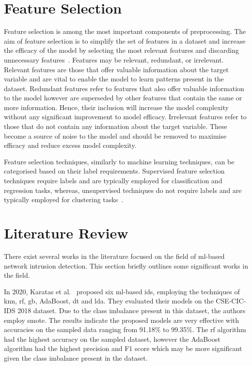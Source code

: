 \section{Feature Selection}%
\label{sec:feat_eng}
Feature selection is among the most important components of preprocessing.
The aim of feature selection is to simplify the set of features in a dataset and
increase the efficacy of the model by selecting the most relevant features and
discarding unnecessary features~\cite{feat-sel}. Features may be relevant,
redundant, or irrelevant. Relevant features are those that offer valuable
information about the target variable and are vital to enable the model to
learn patterns present in the dataset. Redundant features refer to features
that also offer valuable information to the model however are superseded by
other features that contain the same or more information. Hence, their
inclusion will increase the model complexity without any significant
improvement to model efficacy. Irrelevant features refer to those that do not
contain any information about the target variable. These become a source of
noise to the model and should be removed to maximise efficacy and reduce excess
model complexity.

Feature selection techniques, similarly to machine learning techniques, can be
categorised based on their label requirements. Supervised feature selection
techniques require labels and are typically employed for classification and
regression tasks, whereas, unsupervised techniques do not require labels and
are typically employed for clustering tasks~\cite{feat-sel}.

\section{Literature Review}%
\label{sec:literature}

There exist several works in the literature focused on the field of
\gls{ml}-based network intrusion detection. This section briefly outlines some
significant works in the field.

In 2020, Karatas et al.~\cite{Karatas} proposed six \gls{ml}-based \gls{ids},
employing the techniques of \gls{knn}, \gls{rf}, \gls{gb}, AdaBoost, \gls{dt}
and \gls{lda}. They evaluated their models on the CSE-CIC-IDS 2018 dataset. Due
to the class imbalance present in this dataset, the authors employ \gls{smote}.
The results indicate the proposed models are very effective with accuracies on
the sampled data ranging from 91.18\% to 99.35\%. The \gls{rf} algorithm had
the highest accuracy on the sampled dataset, however the AdaBoost algorithm had
the highest precision and F1 score which may be more significant given the
class imbalance present in the dataset.

